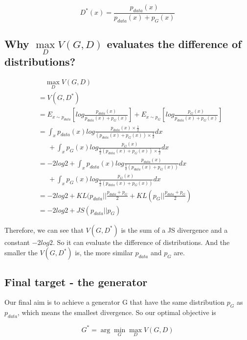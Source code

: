 \documentclass{article} %
\begin{document}
\begin{equation}
    D^{*}(x) = \frac{p_{data}(x)}{p_{data}(x)+p_{G}(x)}
\end{equation}

\subsection{Why $\max \limits_{D} V(G,D)$ evaluates the difference of distributions?}

\begin{equation}
    \begin{split}
        & \quad \max \limits_{D}V(G,D) \\
        & = V(G,D^{*}) \\
        & = E_{x \sim p_{data}}[log\frac{p_{data}(x)}{p_{data}(x)+p_{G}(x)}] + E_{x \sim p_{G}}[log\frac{p_{G}(x)}{p_{data}(x)+p_{G}(x)}] \\
        & = \int_{x}p_{data}(x)log\frac{p_{data}(x) \times \frac{1}{2}}{(p_{data}(x)+p_{G}(x)) \times \frac{1}{2}}dx \\
        & \quad \ \  + \int_{x}p_{G}(x)log\frac{p_{G}(x)}{\frac{1}{2}(p_{data}(x)+p_{G}(x)) \times \frac{1}{2}}dx \\
        & = -2log2 + \int_{x}p_{data}(x)log\frac{p_{data}(x)}{\frac{1}{2}(p_{data}(x)+p_{G}(x))}dx \\
        & \quad \ \  + \int_{x}p_{G}(x)log\frac{p_{G}(x)}{\frac{1}{2}(p_{data}(x)+p_{G}(x))}dx \\
        & = -2log2 + KL(p_{data}||\frac{p_{data}+p_G}{2} + KL(p_{G}||\frac{p_{data}+p_G}{2}) \\
        & = -2log2 + JS(p_{data}||p_G)
    \end{split}
\end{equation}

Therefore, we can see that $V(G,D^{*})$ is the sum of a JS divergence and a constant $-2log2$. So it can evaluate the difference of distributions. And the smaller the $V(G,D^{*})$ is, the more similar $p_{data}$ and $p_G$ are.

\subsection{Final target - the generator}

Our final aim is to achieve a generator G that have the same distribution $p_G$ as $p_{data}$, which means the smallest divergence. So our optimal objective is

\begin{equation}
    G^{*} = \arg \min \limits_{G} \max \limits_{D} V(G,D)
\end{equation}
\end{document}
